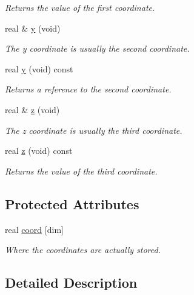 \begin{DoxyCompactItemize}
\begin{DoxyCompactList}\small\item\em Returns the value of the first coordinate. \end{DoxyCompactList}\item 
real \& \hyperlink{classVectorN_a5e4c89d57463830a33a33d4ed20b2ff7}{y} (void)
\begin{DoxyCompactList}\small\item\em The y coordinate is usually the second coordinate. \end{DoxyCompactList}\item 
real \hyperlink{classVectorN_a8009604cc1f15e40f0f8459b16821992}{y} (void) const 
\begin{DoxyCompactList}\small\item\em Returns a reference to the second coordinate. \end{DoxyCompactList}\item 
real \& \hyperlink{classVectorN_acd1728a98fc3acbd47f0bcb29e542e28}{z} (void)
\begin{DoxyCompactList}\small\item\em The z coordinate is usually the third coordinate. \end{DoxyCompactList}\item 
real \hyperlink{classVectorN_a869ec216cbaba126966a10a93f5bcb0a}{z} (void) const 
\begin{DoxyCompactList}\small\item\em Returns the value of the third coordinate. \end{DoxyCompactList}\end{DoxyCompactItemize}
\subsection*{Protected Attributes}
\begin{DoxyCompactItemize}
\item 
\hypertarget{classVectorN_acf9b4d0e9c4591dd61dd0273c6b153f1}{
real \hyperlink{classVectorN_acf9b4d0e9c4591dd61dd0273c6b153f1}{coord} \mbox{[}dim\mbox{]}}
\label{classVectorN_acf9b4d0e9c4591dd61dd0273c6b153f1}

\begin{DoxyCompactList}\small\item\em Where the coordinates are actually stored. \end{DoxyCompactList}\end{DoxyCompactItemize}


\subsection{Detailed Description}
